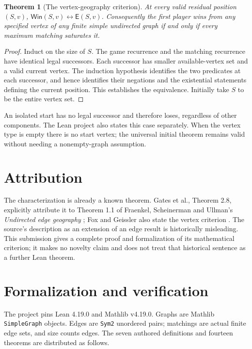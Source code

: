\documentclass[10pt,letterpaper]{article}
\newtheorem{theorem}{Theorem}
\newcommand{\Win}{\mathsf{Win}}
\newcommand{\Ess}{\mathsf{E}}
\newcommand{\code}[1]{\texttt{\small #1}}
\begin{document}
\begin{theorem}[The vertex-geography criterion]
At every valid residual position $(S,v)$,
$\Win(S,v)\longleftrightarrow\Ess(S,v)$.
Consequently the first player wins from any specified vertex of any finite
simple undirected graph if and only if every maximum matching saturates it.
\end{theorem}
\begin{proof}
Induct on the size of $S$. The game recurrence and the matching recurrence
have identical legal successors. Each successor has smaller available-vertex
set and a valid current vertex. The induction hypothesis identifies the two
predicates at each successor, and hence identifies their negations and the
existential statements defining the current position. This establishes the
equivalence. Initially take $S$ to be the entire vertex set.
\end{proof}

An isolated start has no legal successor and therefore loses, regardless of
other components. The Lean project also states this case separately. When the
vertex type is empty there is no start vertex; the universal initial theorem
remains valid without needing a nonempty-graph assumption.

\section*{Attribution}
The characterization is already a known theorem. Gates et al.,
Theorem 2.8, explicitly attribute it to Theorem 1.1 of
Fraenkel, Scheinerman and Ullman's \emph{Undirected edge geography}
\cite{gates,fsu}; Fox and Geissler also state the vertex criterion
\cite{fox}. The source's description as an extension of an edge result is
historically misleading. This submission gives a complete proof and formalization
of its mathematical criterion; it makes no novelty claim and does not treat
that historical sentence as a further Lean theorem.

\newpage
\section*{Formalization and verification}
The project pins Lean 4.19.0 and Mathlib v4.19.0. Graphs are Mathlib
\code{SimpleGraph} objects. Edges are \code{Sym2} unordered pairs;
matchings are actual finite edge sets, and size counts edges.
The seven authored definitions and fourteen theorems are distributed as follows.
\end{document}

